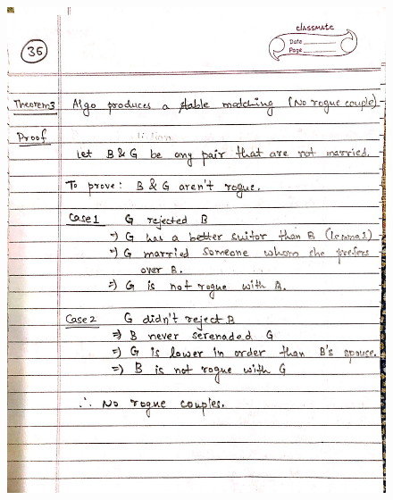 \begin{figure}[H]
    \centering
    \includegraphics[width=16cm, height=21cm]{"./MIT-6.042J/MIT-6042J-036"}
\end{figure}
\newpage
